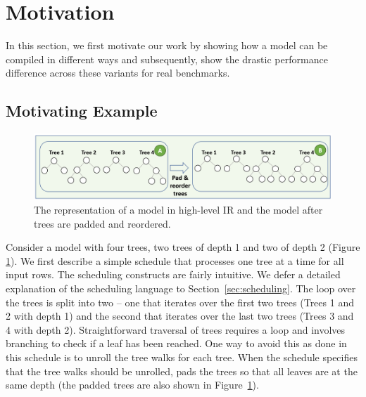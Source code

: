 \section{Motivation}
\label{sec:motivation}
In this section, we first motivate our work by showing how a model can be compiled in different ways
and subsequently, show the drastic performance difference across these variants for real benchmarks.

\subsection{Motivating Example}
\begin{figure}[htb]
  \centering
  \includegraphics[width=\linewidth]{figures/HIR.PNG}
  \caption{The representation of a model in high-level IR and the model 
  after trees are padded and reordered. }
  \label{Fig:HIRExample}
\end{figure}

Consider a model with four trees, two 
trees of depth 1 and two of depth 2 (Figure \ref{Fig:HIRExample}).
We first describe a simple schedule that processes one tree at a time 
for all input rows. The scheduling constructs are fairly intuitive. We 
defer a detailed explanation of the scheduling language to Section~\ref{sec:scheduling}. 
The loop over the trees is split into two -- one that
iterates over the first two trees (Trees 1 and 2 with depth 1) and 
the second that iterates over the last two trees (Trees 3 and 4 with
depth 2). Straightforward traversal of trees requires a  loop
and involves branching to check if a leaf has been reached. 
One way to avoid this as done in this schedule is to unroll the 
tree walks for each tree. 
When the schedule specifies that the tree walks should be unrolled, 
\Treebeard{} pads the trees so that all leaves are at the same depth (the padded trees are also shown in Figure~\ref{Fig:HIRExample}).

